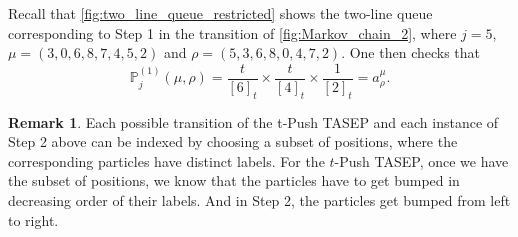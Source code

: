 \documentclass[12pt]{amsart}
\theoremstyle{definition}
\newtheorem{remark}[thm]{Remark}
\newcommand{\PPone}[1]{\mathbb P^{(1)}_{#1}}
\begin{document}
Recall that \cref{fig:two_line_queue_restricted} shows the two-line queue corresponding to Step 1 in the transition of \cref{fig:Markov_chain_2}, where $j=5$, $\mu=(3,0,6,8,7,4,5,2)$ and $\rho=(5,3,6,8,0,4,7,2)$. One then checks that 
$$\PPone{j}(\mu,\rho)=\frac{t}{[6]_t}\times\frac{t}{[4]_t}\times \frac{1}{[2]_t}=a^\mu_\rho.$$



\begin{remark}\label{rmk:subsets}
Each possible transition of the t-Push TASEP and each instance of Step 2 above can be indexed by 
choosing a subset of positions, where the corresponding particles have distinct labels.  For the $t$-Push TASEP, once we have the subset of positions, we know that the particles have to get bumped in decreasing order of their labels.  And in Step 2, the particles get bumped from left to right.
\end{remark}
\end{document}
